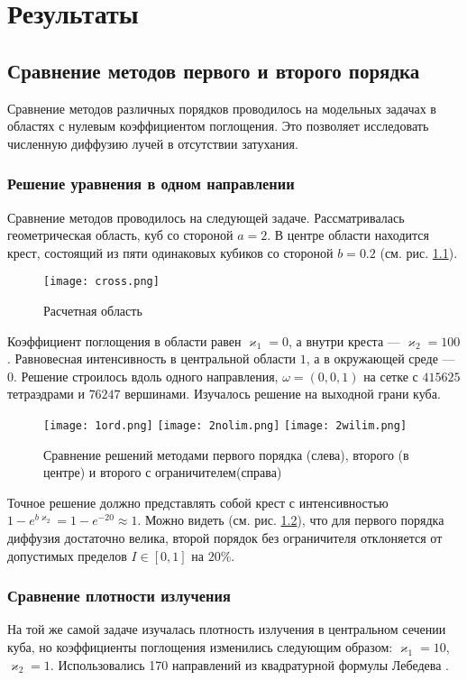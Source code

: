 \chapter{Результаты}

\section{Сравнение методов первого и второго порядка}
Сравнение методов различных порядков проводилось на модельных задачах в областях с нулевым коэффициентом поглощения. Это позволяет исследовать численную диффузию лучей в отсутствии затухания.

\subsection{Решение уравнения в одном направлении}
Сравнение методов проводилось на следующей задаче. Рассматривалась
геометрическая область, куб со стороной $a = 2$. 
В центре области находится
крест, состоящий из пяти одинаковых кубиков со стороной $b = 0.2$ (см. рис. \ref{fig:6}).
\begin{figure}[ht!]
\centering
\texttt{[image: cross.png]}
\caption{Расчетная область}
\label{fig:6}
\end{figure}
Коэффициент поглощения в области равен $\varkappa_1=0$, а внутри креста --- $\varkappa_2 = 100$. Равновесная интенсивность в центральной области $1$, а в окружающей среде --- $0$. Решение строилось вдоль одного направления, $\omega = (0,0,1)$ на сетке с $415625$ тетраэдрами и $76247$ вершинами. Изучалось решение на выходной грани куба. 
\begin{figure}[ht!]
\centering
\texttt{[image: 1ord.png]}%
\texttt{[image: 2nolim.png]}%
\texttt{[image: 2wilim.png]}
\caption{Сравнение решений методами первого порядка (слева), второго (в центре) и второго с ограничителем(справа)}
\label{fig:7}
\end{figure}

Точное решение должно представлять собой крест с интенсивностью $1 -
e^{b\varkappa_2} = 1-e^{-20} \approx 1$. Можно видеть (см. рис. \ref{fig:7}), что для первого порядка диффузия достаточно велика, второй порядок без ограничителя отклоняется от допустимых пределов $I \in [0, 1]$ на $20 \%$.
\subsection{Сравнение плотности излучения}
На той же самой задаче изучалась плотность излучения в центральном сечении куба, но коэффициенты поглощения изменились следующим образом: $\varkappa_1 = 10$, $\varkappa_2 = 1$. Использовались 170 направлений из квадратурной формулы Лебедева \cite{lebedev_1999}. 

